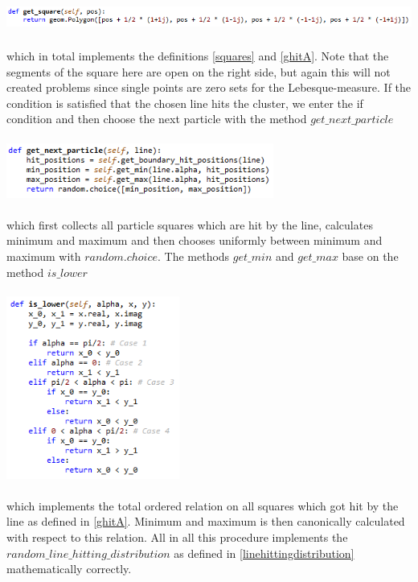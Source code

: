 \documentclass[12pt,a4paper]{scrartcl}
\numberwithin{equation}{subsection}
\newcommand{\1}{\mathbbm{1}}
\numberwithin{equation}{section}
\theoremstyle{definition}
\begin{document}
\\
\includegraphics[height=0.8cm]{images/code-snippets/getsquare.png} \\
\\
which in total implements the definitions \ref{squares} and \ref{ghitA}. Note that the segments of the square here are open on the right side, but again this will not created problems since single points are zero sets for the Lebesque-measure.
If the condition is satisfied that the chosen line hits the cluster, we enter the if condition and then choose the next particle with the method $\mathit{get\_next\_particle}$\\
\\
\includegraphics[height=1.8cm]{images/code-snippets/nextparticle.png} \\
\\
which first collects all particle squares which are hit by the line, calculates minimum and maximum and then chooses uniformly between minimum and maximum with $\mathit{random.choice}$. The methods $\mathit{get\_min}$ and $\mathit{get\_max}$ base on the method $\mathit{is\_lower}$\\
\\
\includegraphics[height=6cm]{images/code-snippets/islower.png} \\
\\
which implements the total ordered relation on all squares which got hit by the line as defined in \ref{ghitA}. Minimum and maximum is then canonically calculated with respect to this relation. All in all this procedure implements the $\mathit{random\_line\_hitting\_distribution}$ as defined in \ref{linehittingdistribution} mathematically correctly. 
\end{document}
